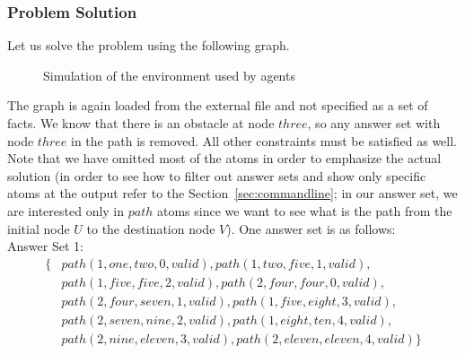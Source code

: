 \documentclass[a4paper, titlepage]{article}
\begin{document}
\subsubsection{Problem Solution} 
Let us solve the problem using the following graph.  
\begin{figure}
\begin{center}
\end{center}
\caption{Simulation of the environment used by agents}
\end{figure}
The graph is again loaded from the external file and not 
specified as a set of facts. We know that there is an obstacle at node $\mathit{three}$, so any answer set with node 
$\mathit{three}$ in the path is removed. All other 
constraints must be satisfied as well. Note that we have 
omitted most of the atoms in order to emphasize the actual 
solution (in order to see how to filter out answer sets and 
show only specific atoms at the output refer to the 
Section~\ref{sec:commandline}; in our answer set, we are 
interested only in $\mathit{path}$ atoms since we want to 
see what is the path from the initial node $U$ to the 
destination node $V$). One answer set is as follows:
\\Answer Set 1:
\begin{align*}
\{ & path(1,one,two,0,valid), path(1,two,five,1,valid),
\\ & path(1,five,five,2,valid), path(2,four,four,0,valid),
\\ & path(2,four,seven,1,valid), 
path(1,five,eight,3,valid),
\\ & path(2,seven,nine,2,valid), path(1,eight,ten,4,valid),
\\ & 
path(2,nine,eleven,3,valid),path(2,eleven,eleven,4,valid) 
\}
\end{align*} 
\end{document}
